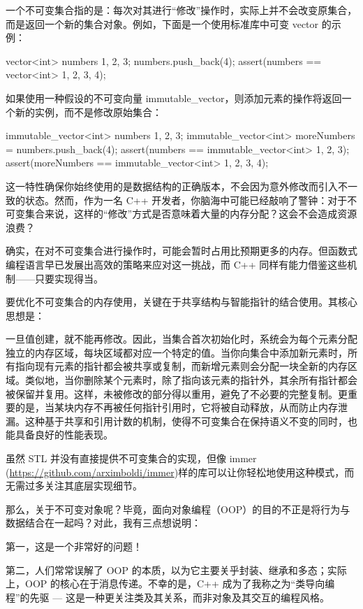 一个不可变集合指的是：每次对其进行“修改”操作时，实际上并不会改变原集合，而是返回一个新的集合对象。例如，下面是一个使用标准库中可变 vector 的示例：

\begin{cpp}
vector<int> numbers {1, 2, 3};
numbers.push_back(4);
assert(numbers == vector<int> {1, 2, 3, 4});
\end{cpp}

如果使用一种假设的不可变向量 immutable\_vector，则添加元素的操作将返回一个新的实例，而不是修改原始集合：

\begin{cpp}
immutable_vector<int> numbers {1, 2, 3};
immutable_vector<int> moreNumbers = numbers.push_back(4);
assert(numbers == immutable_vector<int> {1, 2, 3});
assert(moreNumbers == immutable_vector<int> {1, 2, 3, 4});
\end{cpp}

这一特性确保你始终使用的是数据结构的正确版本，不会因为意外修改而引入不一致的状态。然而，作为一名 C++ 开发者，你脑海中可能已经敲响了警钟：对于不可变集合来说，这样的“修改”方式是否意味着大量的内存分配？这会不会造成资源浪费？

确实，在对不可变集合进行操作时，可能会暂时占用比预期更多的内存。但函数式编程语言早已发展出高效的策略来应对这一挑战，而 C++ 同样有能力借鉴这些机制——只要实现得当。

要优化不可变集合的内存使用，关键在于共享结构与智能指针的结合使用。其核心思想是：

一旦值创建，就不能再修改。因此，当集合首次初始化时，系统会为每个元素分配独立的内存区域，每块区域都对应一个特定的值。当你向集合中添加新元素时，所有指向现有元素的指针都会被共享或复制，而新增元素则会分配一块全新的内存区域。类似地，当你删除某个元素时，除了指向该元素的指针外，其余所有指针都会被保留并复用。这样，未被修改的部分得以重用，避免了不必要的完整复制。更重要的是，当某块内存不再被任何指针引用时，它将被自动释放，从而防止内存泄漏。这种基于共享和引用计数的机制，使得不可变集合在保持语义不变的同时，也能具备良好的性能表现。

虽然 STL 并没有直接提供不可变集合的实现，但像 immer (\url{https://github.com/arximboldi/immer})样的库可以让你轻松地使用这种模式，而无需过多关注其底层实现细节。

那么，关于不可变对象呢？毕竟，面向对象编程（OOP）的目的不正是将行为与数据结合在一起吗？对此，我有三点想说明：

第一，这是一个非常好的问题！

第二，人们常常误解了 OOP 的本质，以为它主要关乎封装、继承和多态；实际上，OOP 的核心在于消息传递。不幸的是，C++ 成为了我称之为“类导向编程”的先驱 --- 这是一种更关注类及其关系，而非对象及其交互的编程风格。

